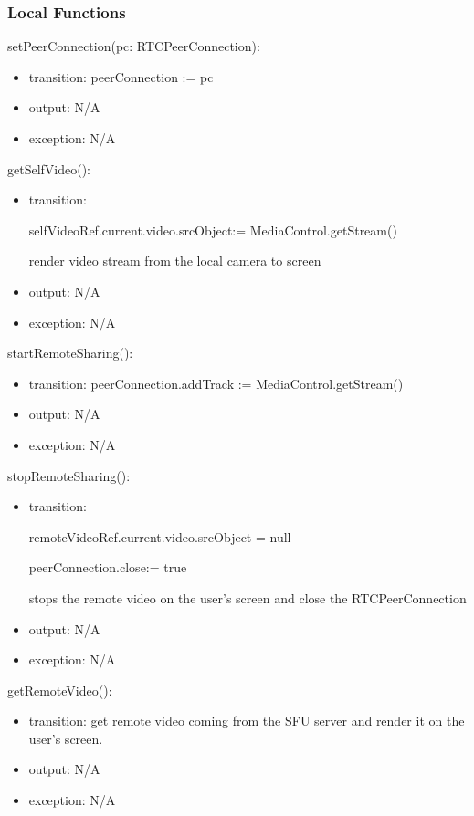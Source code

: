 \documentclass[12pt, titlepage]{article}
\begin{document}
\subsubsection{Local Functions}

\noindent setPeerConnection(pc: RTCPeerConnection):
\begin{itemize}
\item transition: peerConnection := pc
\item output: N/A
\item exception: N/A
\end{itemize}

\noindent getSelfVideo():
\begin{itemize}
\item transition:

  selfVideoRef.current.video.srcObject:= MediaControl.getStream()

  render video stream from the local camera to screen
\item output: N/A
\item exception: N/A
\end{itemize}

\noindent startRemoteSharing():
\begin{itemize}
\item transition: peerConnection.addTrack := MediaControl.getStream()
\item output: N/A
\item exception: N/A
\end{itemize}

\noindent stopRemoteSharing():
\begin{itemize}
\item transition:

  remoteVideoRef.current.video.srcObject = null

  peerConnection.close:= true

  stops the remote video on the user’s screen and close the RTCPeerConnection
\item output: N/A
\item exception: N/A
\end{itemize}

\noindent getRemoteVideo():
\begin{itemize}
\item transition: get remote video coming from the SFU server and render it on the
  user's screen.
\item output: N/A
\item exception: N/A
\end{itemize}
\end{document}
